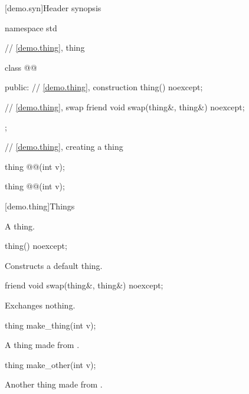 [demo.syn]{Header  synopsis}

\begin{codeblock}
namespace std {
  // \ref{demo.thing}, thing

  class @@ {
  public:
    // \ref{demo.thing}, construction
    thing() noexcept;

    // \ref{demo.thing}, swap
    friend void swap(thing&, thing&) noexcept;
  };

  // \ref{demo.thing}, creating a thing

  thing @@(int v);

  thing @@(int v);
}
\end{codeblock}

[demo.thing]{Things}

\pnum
\remarks
A thing.

%
\begin{itemdecl}
thing() noexcept;
\end{itemdecl}

\begin{itemdescr}
\pnum
\effects
Constructs a default thing.
\end{itemdescr}

%
\begin{itemdecl}
friend void swap(thing&, thing&) noexcept;
\end{itemdecl}

\begin{itemdescr}
\pnum
\effects
Exchanges nothing.
\end{itemdescr}

%
\begin{itemdecl}
thing make_thing(int v);
\end{itemdecl}

\begin{itemdescr}
\pnum
\returns
A thing made from .
\end{itemdescr}

%
\begin{itemdecl}
thing make_other(int v);
\end{itemdecl}

\begin{itemdescr}
\pnum
\returns
Another thing made from .
\end{itemdescr}
